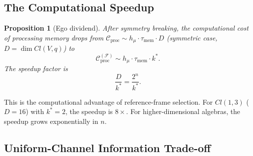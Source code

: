 \documentclass[12pt]{article}
\newtheorem{proposition}[theorem]{Proposition}
\begin{document}
\subsection{The Computational Speedup}
\label{subsec:speedup}

\begin{proposition}[Ego dividend]
\label{prop:speedup}
After symmetry breaking, the computational cost of
processing memory drops from
$\mathcal{C}_{\mathrm{proc}} \sim h_\mu \cdot
\tau_{\mathrm{mem}} \cdot D$
(symmetric case, $D = \dim Cl(V,q)$) to
\begin{equation}
\label{eq:speedup}
\mathcal{C}_{\mathrm{proc}}^{(\mathcal{F})}
\sim h_\mu \cdot \tau_{\mathrm{mem}}
     \cdot k^*.
\end{equation}
The speedup factor is
\begin{equation}
\label{eq:speedup_factor}
\frac{D}{k^*} = \frac{2^n}{k^*}.
\end{equation}
\end{proposition}

This is the computational advantage of reference-frame
selection.
For $Cl(1,3)$ ($D = 16$) with $k^* = 2$, the speedup is
$8\times$.
For higher-dimensional algebras, the speedup grows
exponentially in $n$.

\subsection{Uniform-Channel Information Trade-off}
\label{subsec:tradeoff}
\end{document}
